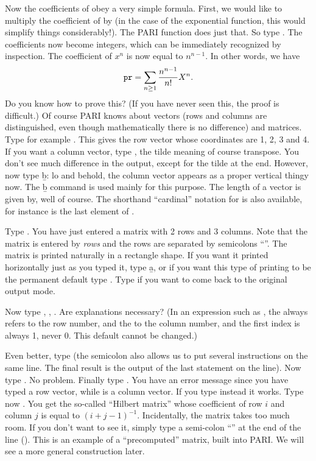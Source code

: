 Now the coefficients of  obey a very simple formula. First, we would
like to multiply the coefficient of  by  (in the case of
the exponential function, this would simplify things considerably!). The PARI
function  does just that. So type .
The coefficients now become integers, which can be immediately recognized by
inspection. The coefficient of $x^n$ is now equal to
$n^{n-1}$. In other words, we have
%
$${\tt pr} = \sum_{n\ge1}{{n^{n-1}}\over{n!}} X^{n}.$$
%
Do you know how to prove this? (If you have never seen this, the proof is
difficult.)
\smallskip
%
Of course PARI knows about vectors (rows and columns are distinguished, even
though mathematically there is no difference) and matrices. Type for example
\kbd{[1,2,3,4]}. This gives the row vector whose coordinates are 1, 2, 3 and
4.  If you want a column vector, type \kbd{[1,2,3,4]\til}, the tilde meaning
of course transpose. You don't see much difference in the output, except for
the tilde at the end. However, now type \b{b}: lo and behold, the column
vector appears as a proper vertical thingy now. The \b{b} command is used
mainly for this purpose. The length of a vector is given by, well
 of course. The shorthand ``cardinal'' notation  for
 is also available, for instance  is the last
element of .

Type . You have just entered a matrix with 2 rows and
3 columns. Note that the matrix is entered by \emph{rows} and the rows are
separated by semicolons ``\kbd{;}''. The matrix is printed naturally in a
rectangle shape. If you want it printed horizontally just as you typed it,
type \b{a}, or if you want this type of printing to be the permanent default
type . Type  if you want to
come back to the original output mode.

Now type , , . Are explanations necessary?
(In an expression such as , the  always refers to the
row number, and the  to the column number, and the first index is
always 1, never 0. This default cannot be changed.)

Even better, type  (the semicolon also allows us to put
several instructions on the same line. The final result is the output of
the last statement on the line). Now type . No
problem. Finally type . You have an error message since you
have typed a row vector, while  is a column vector. If you type
instead  it works. \smallskip
%
\label{se:types}
Type now . You get the so-called ``Hilbert matrix''
whose coefficient of row $i$ and column $j$ is equal to $(i+j-1)^{-1}$.
Incidentally, the matrix  takes too much room. If you don't want to
see it, simply type a semi-colon ``\kbd{;}'' at the end of the line
(). This is an example of a ``precomputed'' matrix,
built into PARI. We will see a more general construction later.

